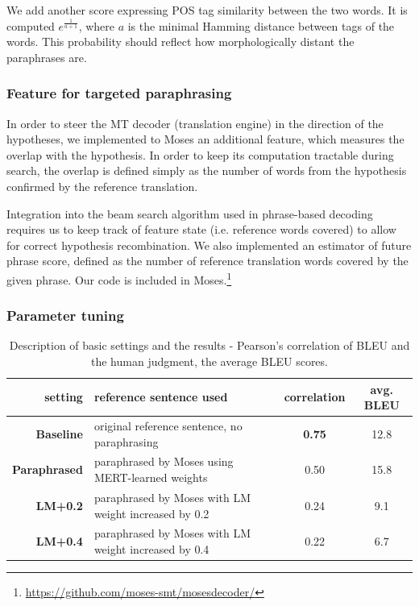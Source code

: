 \documentclass[11pt]{article}
\def\footurl#1{\footnote{\url{#1}}}
\begin{document}
We add another score expressing POS tag similarity between the two words. It is 
computed $ e^{\frac{1}{a+1}}$, where $ a $ is the minimal Hamming distance 
between tags of the words. This probability should reflect how morphologically 
distant the paraphrases are. 

\subsubsection{Feature for targeted paraphrasing}
In order to steer the MT decoder (translation engine) in the direction of the 
hypotheses, we implemented to Moses an additional feature, which measures the 
overlap with the hypothesis. In order to keep its computation tractable during 
search, the overlap is defined simply as the number of words from the 
hypothesis confirmed by the reference translation.

Integration into the beam search algorithm used in phrase-based decoding
requires us to keep track of feature state (i.e. reference words covered) to
allow for correct hypothesis recombination. We also implemented an estimator of
future phrase score, defined as the number of reference translation words
covered by the given phrase. Our code is included in
Moses.\footurl{https://github.com/moses-smt/mosesdecoder/}

\subsubsection{Parameter tuning}

\begin{table}[tb]
\begin{tabular}{r|l|c|c}
setting & reference sentence used & correlation & avg. BLEU \\
\hline
\textbf{Baseline} & original reference sentence, no paraphrasing & \textbf{0.75} & 12.8 \\
\textbf{Paraphrased} & paraphrased by Moses using MERT-learned weights  & 0.50  & 15.8 \\
\textbf{LM+0.2}  & paraphrased by Moses with LM weight increased by 0.2  & 0.24 & 9.1 \\
\textbf{LM+0.4} & paraphrased by Moses with LM weight increased by 0.4  & 0.22 & 6.7 \\
\end{tabular}
\caption{Description of basic settings and the results - Pearson's correlation of BLEU and the
human judgment, the average BLEU scores.} 
\label{settings}
\end{table}
\end{document}
